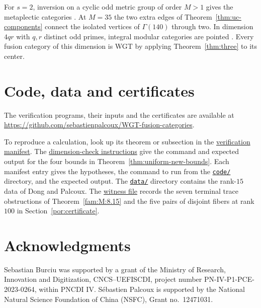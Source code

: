 \documentclass[11pt,a4paper]{article}
\numberwithin{equation}{section}
\theoremstyle{remark}
\begin{document}
For $s=2$, inversion on a cyclic odd metric group of order $M>1$
gives the metaplectic categories \cite[Theorem~3.2]{ACRW}. At $M=35$
the two extra edges of Theorem~\ref{thm:uc-components} connect
the isolated vertices of $\Gamma(140)$ through two. In dimension
$4qr$ with $q,r$ distinct odd primes, integral modular categories
are pointed \cite[Theorem~3.1]{BGNPW}. Every fusion category of
this dimension is WGT by applying Theorem~\ref{thm:three} to its center.

\section*{Code, data and certificates}
\label{sec:code-data-certificates}
The verification programs, their inputs and the certificates are available at\\
\url{https://github.com/sebastienpalcoux/WGT-fusion-categories}.

To reproduce a calculation, look up its theorem or subsection in the
\href{https://github.com/sebastienpalcoux/WGT-fusion-categories/blob/main/certificates/manifest.json}{verification manifest}.
The \href{https://github.com/sebastienpalcoux/WGT-fusion-categories/blob/48d2813db714e314684fd79f5ba565b81c16a2be/code/README.md#dimension-comparison}{dimension-check instructions}
give the command and expected output for the four bounds in Theorem~\ref{thm:uniform-new-bounds}.
Each manifest entry gives the hypotheses, the command to run from the
\href{https://github.com/sebastienpalcoux/WGT-fusion-categories/tree/main/code}{\texttt{code/}} directory, and the expected output.
The \href{https://github.com/sebastienpalcoux/WGT-fusion-categories/tree/main/data}{\texttt{data/}} directory contains the rank-$15$ data of Dong and Palcoux.
The \href{https://github.com/sebastienpalcoux/WGT-fusion-categories/blob/main/certificates/certificates.json}{witness file}
records the seven terminal trace obstructions of Theorem~\ref{fam:M:8.15} and the five pairs of disjoint fibers at rank $100$ in Section~\ref{por:certificate}.

\section*{Acknowledgments}
Sebastian Burciu was supported by a grant of the Ministry of Research,
Innovation and Digitization, CNCS--UEFISCDI, project number
PN-IV-P1-PCE-2023-0264, within PNCDI IV.
S\'ebastien Palcoux is supported by the National Natural Science
Foundation of China (NSFC), Grant no.~12471031.
\end{document}
